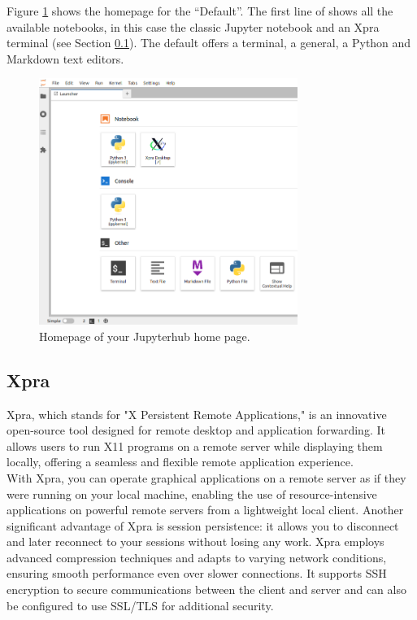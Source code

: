 Figure \ref{homepage} shows the homepage for the \uninuvola  ``Default''. The first line of shows all the available notebooks, in this case the classic Jupyter notebook and an Xpra terminal (see Section \ref{xpra}). The default offers a terminal, a general, a Python and Markdown text editors. \\
\begin{figure}[htbp]
    \centering
    \includegraphics[width=0.75\textwidth]{figures/homepage.png}
    \caption{Homepage of your Jupyterhub home page. }
    \label{homepage}
\end{figure}


\subsection{Xpra}\label{xpra}

Xpra,\cite{Xpra} which stands for "X Persistent Remote Applications," is an innovative open-source tool designed for remote desktop and application forwarding. It allows users to run X11 programs on a remote server while displaying them locally, offering a seamless and flexible remote application experience.\\

With Xpra, you can operate graphical applications on a remote server as if they were running on your local machine, enabling the use of resource-intensive applications on powerful remote servers from a lightweight local client. Another significant advantage of Xpra is session persistence: it allows you to disconnect and later reconnect to your sessions without losing any work. Xpra employs advanced compression techniques and adapts to varying network conditions, ensuring smooth performance even over slower connections. It supports SSH encryption to secure communications between the client and server and can also be configured to use SSL/TLS for additional security. \\

